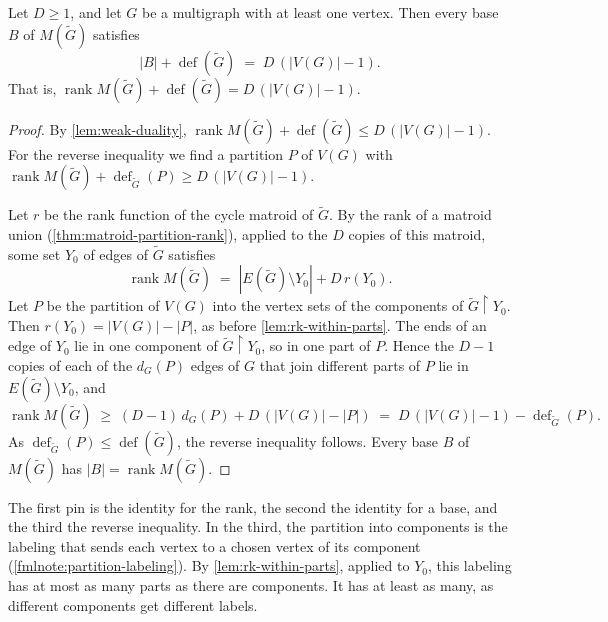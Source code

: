 \begin{theorem}
  \label{thm:def-eq-corank}
  \leanok
  Let $D \ge 1$, and let $G$ be a multigraph with at least one vertex.
  Then every base $B$ of $M(\tilde G)$ satisfies
  \[
    |B| + \operatorname{def}(\tilde G) \;=\; D\,(|V(G)| - 1).
  \]
  That is,
  $\operatorname{rank} M(\tilde G) + \operatorname{def}(\tilde G) =
  D\,(|V(G)| - 1)$.
\end{theorem}
\begin{proof}
  \leanok
  By \cref{lem:weak-duality},
  $\operatorname{rank} M(\tilde G) + \operatorname{def}(\tilde G) \le
  D\,(|V(G)| - 1)$. For the reverse inequality we find a partition $P$
  of $V(G)$ with
  $\operatorname{rank} M(\tilde G) + \operatorname{def}_{\tilde G}(P)
  \ge D\,(|V(G)| - 1)$.

  Let $r$ be the rank function of the cycle matroid of $\tilde G$. By the
  rank of a matroid union (\cref{thm:matroid-partition-rank}), applied
  to the $D$ copies of this matroid, some set $Y_0$ of edges of
  $\tilde G$ satisfies
  \[
    \operatorname{rank} M(\tilde G) \;=\;
    |E(\tilde G) \setminus Y_0| + D\,r(Y_0).
  \]
  Let $P$ be the partition of $V(G)$ into the vertex sets of the
  components of $\tilde G \restriction Y_0$. Then
  $r(Y_0) = |V(G)| - |P|$, as before \cref{lem:rk-within-parts}. The
  ends of an edge of $Y_0$ lie in one component of
  $\tilde G \restriction Y_0$, so in one part of $P$. Hence the $D - 1$
  copies of each of the $d_G(P)$ edges of $G$ that join different parts
  of $P$ lie in $E(\tilde G) \setminus Y_0$, and
  \[
    \operatorname{rank} M(\tilde G) \;\ge\;
    (D-1)\,d_G(P) + D\,(|V(G)| - |P|) \;=\;
    D\,(|V(G)| - 1) - \operatorname{def}_{\tilde G}(P).
  \]
  As $\operatorname{def}_{\tilde G}(P) \le \operatorname{def}(\tilde G)$,
  the reverse inequality follows. Every base $B$ of $M(\tilde G)$ has
  $|B| = \operatorname{rank} M(\tilde G)$.
\end{proof}
\begin{fmlnote}
  The first pin is the identity for the rank, the second the identity
  for a base, and the third the reverse inequality. In the third, the
  partition into components is the labeling that sends each vertex to a
  chosen vertex of its component (\cref{fmlnote:partition-labeling}).
  By \cref{lem:rk-within-parts}, applied to $Y_0$, this labeling has
  at most as many parts as there are components. It
  has at least as many, as different components get different labels.
\end{fmlnote}

